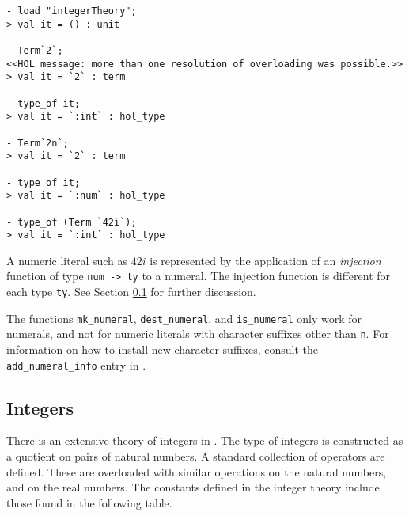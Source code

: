 \begin{session}
\begin{verbatim}
- load "integerTheory";
> val it = () : unit

- Term`2`;
<<HOL message: more than one resolution of overloading was possible.>>
> val it = `2` : term

- type_of it;
> val it = `:int` : hol_type

- Term`2n`;
> val it = `2` : term

- type_of it;
> val it = `:num` : hol_type

- type_of (Term `42i`);
> val it = `:int` : hol_type
\end{verbatim}
\end{session}

A numeric literal such as $42i$ is represented by the application of an
\emph{injection} function of type {\small\verb+num -> ty+} to a
numeral. The injection function is different for each type
{\small\verb+ty+}. See Section \ref{integers} for further discussion.

The functions {\small\verb+mk_numeral+},
{\small\verb+dest_numeral+}, and {\small\verb+is_numeral+} only work for
numerals, and not for numeric literals with character suffixes other
than {\small\verb+n+}. For information on how to install new character
suffixes, consult the {\small\verb+add_numeral_info+} entry in
\REFERENCE.

\subsection{Integers}\label{integers}

There is an extensive theory of integers in \HOL. The type of integers
is constructed as a quotient on pairs of natural numbers. A standard
collection of operators are defined. These are overloaded with
similar operations on the natural numbers, and on the real numbers.
The constants defined in the integer theory include those found in the
following table.

